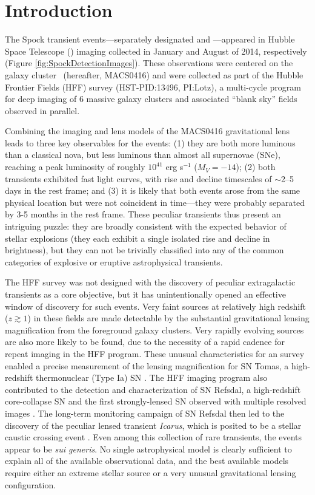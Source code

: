 \section{Introduction}\label{sec:Introduction}

The Spock transient events---separately designated \spockone and
\spocktwo---appeared in Hubble Space Telescope (\HST) imaging
collected in January and August of 2014, respectively (Figure
\ref{fig:SpockDetectionImages}).  These observations were centered on
the galaxy cluster \ (hereafter, MACS0416) and were collected
as part of the Hubble Frontier Fields (HFF) survey (HST-PID:13496,
PI:Lotz), a multi-cycle program for deep imaging of 6 massive galaxy
clusters and associated ``blank sky'' fields observed in parallel.

Combining the \HST imaging and lens models of the MACS0416 gravitational
lens leads to three key observables for the \spock events: (1) they are
both more luminous than a classical nova, but less luminous than
almost all supernovae (SNe), reaching a peak luminosity of roughly
$10^{41}$ erg s$^{−1}$ ($M_V=−14$); (2) both transients exhibited fast
light curves, with rise and decline timescales of $\sim$2--5 days in
the rest frame; and (3) it is likely that both events arose from the
same physical location but were not coincident in time---they were
probably separated by 3-5 months in the rest frame. These peculiar
transients thus present an intriguing puzzle: they are broadly
consistent with the expected behavior of stellar explosions (they each
exhibit a single isolated rise and decline in brightness), but they
can not be trivially classified into any of the common categories of
explosive or eruptive astrophysical transients.  

The HFF survey was not designed with the discovery of peculiar
extragalactic transients as a core objective, but it has
unintentionally opened an effective window of discovery for such
events.  Very faint sources at relatively high redshift ($z\gtrsim1$)
in these fields are made detectable by the substantial gravitational
lensing magnification from the foreground galaxy clusters.  Very
rapidly evolving sources are also more likely to be found, due to the
necessity of a rapid cadence for repeat imaging in the HFF program.
These unusual characteristics for an \HST survey enabled a precise
measurement of the lensing magnification for SN Tomas, a high-redshift
thermonuclear (Type Ia) SN \citep{Rodney:2015a}.  The HFF imaging
program also contributed to the detection and characterization of SN
Refsdal, a high-redshift core-collapse SN and the first
strongly-lensed SN observed with multiple resolved images
\citep{Kelly:2015a}.  The long-term monitoring campaign of SN Refsdal
then led to the discovery of the peculiar lensed transient {\it
  Icarus}, which is posited to be a stellar caustic crossing event
\citep{Kelly:2016}.  Even among this collection of rare transients,
the \spock events appear to be {\it sui generis}.  No single
astrophysical model is clearly sufficient to explain all of the
available observational data, and the best available models require
either an extreme stellar source or a very unusual gravitational
lensing configuration.

